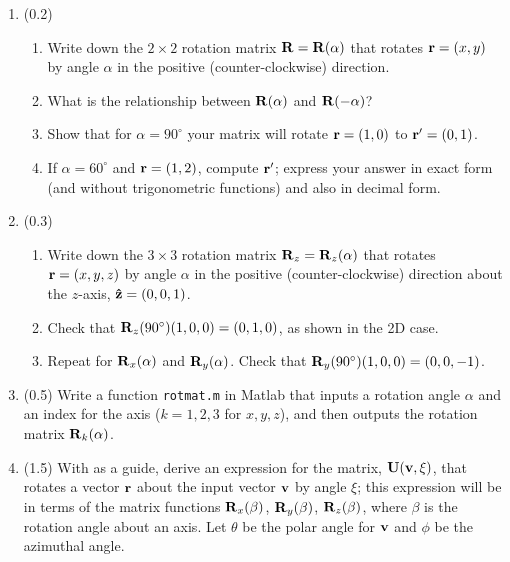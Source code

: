 \documentclass[11pt,titlepage,fleqn]{article}
\newcommand{\rotangA}{\alpha}
\newcommand{\rotangB}{\xi}    %
\newcommand{\rotvec}{\bv}      %
\begin{document}
\begin{enumerate}
\item (0.2) 

\begin{enumerate}
\item Write down the $2 \times 2$ rotation matrix $\bR = \bR(\rotangA)$ that rotates $\mbox{${\bf r}$} = (x,y)$ by angle $\rotangA$ in the positive (counter-clockwise) direction.
\item What is the relationship between $\bR(\rotangA)$ and $\bR(-\rotangA)$?
\item Show that for $\rotangA = 90^\circ$ your matrix will rotate $\mbox{${\bf r}$} = (1,0)$ to $\mbox{${\bf r}$}' = (0,1)$.
\item If $\rotangA = 60^\circ$ and $\mbox{${\bf r}$} = (1,2)$, compute $\mbox{${\bf r}$}'$; express your answer in exact form (and without trigonometric functions) and also in decimal form.
\end{enumerate}

\item (0.3)

\begin{enumerate}
\item Write down the $3 \times 3$ rotation matrix $\bR_z = \bR_z(\rotangA)$ that rotates $\mbox{${\bf r}$} = (x,y,z)$ by angle $\rotangA$ in the positive (counter-clockwise) direction about the $z$-axis, $\mbox{\boldmath{$\hat{\rm z}$}} = (0,0,1)$.
\item Check that $\mbox{${\bf R}$}_z(90^\circ)(1,0,0) = (0,1,0)$, as shown in the 2D case.
\item Repeat for $\bR_x(\rotangA)$ and $\bR_y(\rotangA)$. Check that $\mbox{${\bf R}$}_y(90^\circ)(1,0,0) = (0,0,-1)$.
\end{enumerate}

\item (0.5) Write a function \verb+rotmat.m+ in Matlab that inputs a rotation angle $\rotangA$ and an index for the axis ($k = 1,2,3$ for $x,y,z$), and then outputs the rotation matrix $\bR_k(\rotangA)$. 

\item (1.5) With  as a guide, derive an expression for the matrix, $\bU(\rotvec,\rotangB)$, that rotates a vector $\mbox{${\bf r}$}$ about the input vector $\rotvec$ by angle $\rotangB$; this expression will be in terms of the matrix functions $\mbox{${\bf R}$}_x(\beta)$, $\mbox{${\bf R}$}_y(\beta)$, $\mbox{${\bf R}$}_z(\beta)$, where $\beta$ is the rotation angle about an axis. Let $\theta$ be the polar angle for $\rotvec$ and $\phi$ be the azimuthal angle.



\end{enumerate}
\end{document}
